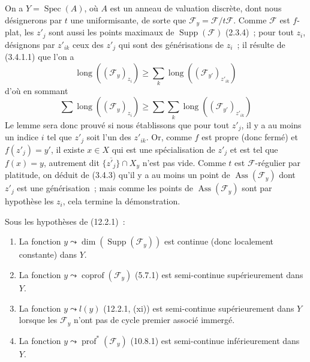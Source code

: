 \begin{env}[12.2.1.3]
On a $Y=\operatorname{Spec}(A)$, où $A$ est un anneau de valuation discrète,
dont nous désignerons par $t$ une uniformisante, de sorte que
$\mathcal F_y=\mathcal F/t\mathcal F$. Comme $\mathcal F$ est $f$-plat, les
$z'_j$ sont aussi les points maximaux de $\operatorname{Supp}(\mathcal F)$
(2.3.4)~; pour tout $z_i$, désignons par $z'_{ik}$ ceux des $z'_j$ qui sont des
générisations de $z_i$~; il résulte de (3.4.1.1) que l'on a
\[
  \operatorname{long}((\mathcal F_y)_{z_i})
  \geq\sum_k\operatorname{long}((\mathcal F_{y'})_{z'_{ik}})
\]
d'où en sommant
\[
  \sum\operatorname{long}((\mathcal F_y)_{z_i})
  \geq\sum\sum_k\operatorname{long}((\mathcal F_{y'})_{z'_{ik}})
\]
Le lemme sera donc prouvé si nous établissons que pour tout $z'_j$, il y a au
moins un indice $i$ tel que $z'_j$ soit l'un des $z'_{ik}$. Or, comme $f$ est
propre (donc fermé) et $f(z'_j)=y'$, il existe $x\in X$ qui est une
spécialisation de $z'_j$ et est tel que $f(x)=y$, autrement dit
$\overline{\{z'_j\}}\cap X_y$ n'est pas vide. Comme $t$ est
$\mathcal F$-régulier par platitude, on déduit de (3.4.3) qu'il y a au moins un
point de $\operatorname{Ass}(\mathcal F_y)$ dont $z'_j$ est une
générisation~; mais comme les points de $\operatorname{Ass}(\mathcal F_y)$
sont par hypothèse les $z_i$, cela termine la démonstration.
\end{env}

\begin{corollary}[12.2.2]
\label{IV.12.2.2-fr}
Sous les hypothèses de \textup{(12.2.1)}~:
\begin{enumerate}[label=\textup{(\roman*)}]
  \item La fonction $y\leadsto\dim(\operatorname{Supp}(\mathcal F_y))$ est
  continue (donc localement constante) dans $Y$.
  \item La fonction $y\leadsto\operatorname{coprof}(\mathcal F_y)$ \textup{(5.7.1)} est
  semi-continue supérieurement dans $Y$.
  \item La fonction $y\leadsto l(y)$ \textup{(12.2.1, (xi))} est semi-continue
  supérieurement dans $Y$ lorsque les $\mathcal F_y$ n'ont pas de cycle
  premier associé immergé.
  \item La fonction $y\leadsto\operatorname{prof}^{*}(\mathcal F_y)$ \textup{(10.8.1)}
  est semi-continue inférieurement dans $Y$.
\end{enumerate}
\end{corollary}

